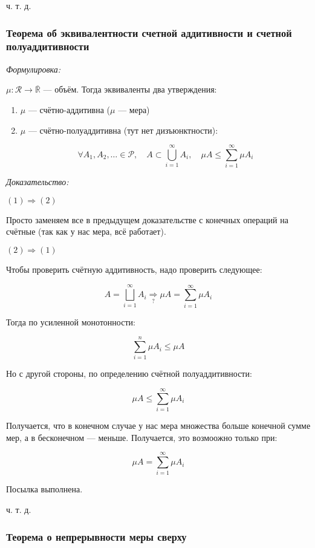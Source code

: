 \documentclass{article}
\begin{document}
ч. т. д. 

\subsubsection{Теорема об эквивалентности счетной аддитивности и счетной полуаддитивности}

\textit{Формулировка:}

$\mu: \mathcal{R} \rightarrow \overline{\mathbb{R}}$ --- объём. Тогда эквиваленты два утверждения:

\begin{enumerate}
    \item $\mu$ --- счётно-аддитивна ($\mu$ --- мера)
    \item $\mu$ --- счётно-полуаддитивна (тут нет дизъюнктности): 
    
    \[\forall A_1, A_2, \ldots \in \mathcal{P}, \quad A \subset \bigcup_{i = 1}^{\infty} A_i, \quad \mu A \le \sum_{i = 1}^{\infty} \mu A_i\]
\end{enumerate}

\textit{Доказательство:}

\textbf{$(1) \Rightarrow (2)$}

Просто заменяем все  в предыдущем доказательстве с конечных операций на счётные (так как у нас мера, всё работает).

\textbf{$(2) \Rightarrow (1)$}

Чтобы проверить счётную аддитивность, надо проверить следующее:

\[A = \bigsqcup_{i = 1}^{\infty} A_i \underset{?}{\Rightarrow} \mu A = \sum_{i = 1}^{\infty} \mu A_i\]

Тогда по усиленной монотонности: 

\[\sum_{i = 1}^{n} \mu A_i \le \mu A\]

Но с другой стороны, по определению счётной полуаддитивности: 

\[\mu A \le \sum_{i = 1}^{\infty} \mu A_i\]

Получается, что в конечном случае у нас мера множества больше конечной сумме мер, а в бесконечном --- меньше. Получается, это возмоожно только при: 

\[\mu A = \sum_{i = 1}^{\infty} \mu A_i\]

Посылка выполнена. 

ч. т. д.


\subsubsection{Теорема о непрерывности меры сверху}
\end{document}
